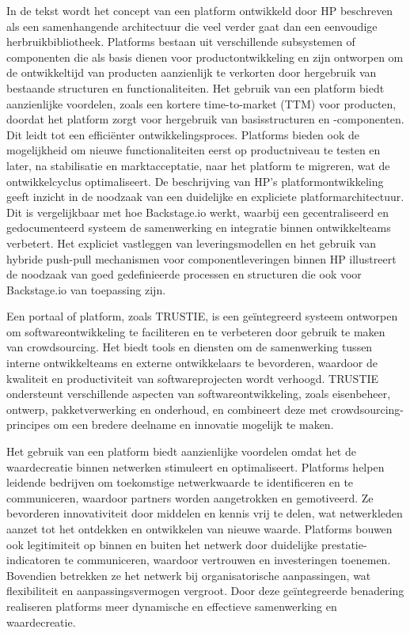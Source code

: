 \textcite{manysoftwarefirmwareproductstoday1996} In de tekst wordt het concept van een platform ontwikkeld door HP beschreven als een samenhangende architectuur die veel verder gaat dan een eenvoudige herbruikbibliotheek. Platforms bestaan uit verschillende subsystemen of componenten die als basis dienen voor productontwikkeling en zijn ontworpen om de ontwikkeltijd van producten aanzienlijk te verkorten door hergebruik van bestaande structuren en functionaliteiten. Het gebruik van een platform biedt aanzienlijke voordelen, zoals een kortere time-to-market (TTM) voor producten, doordat het platform zorgt voor hergebruik van basisstructuren en -componenten. Dit leidt tot een efficiënter ontwikkelingsproces. Platforms bieden ook de mogelijkheid om nieuwe functionaliteiten eerst op productniveau te testen en later, na stabilisatie en marktacceptatie, naar het platform te migreren, wat de ontwikkelcyclus optimaliseert. De beschrijving van HP’s platformontwikkeling geeft inzicht in de noodzaak van een duidelijke en expliciete platformarchitectuur. Dit is vergelijkbaar met hoe Backstage.io werkt, waarbij een gecentraliseerd en gedocumenteerd systeem de samenwerking en integratie binnen ontwikkelteams verbetert. Het expliciet vastleggen van leveringsmodellen en het gebruik van hybride push-pull mechanismen voor componentleveringen binnen HP illustreert de noodzaak van goed gedefinieerde processen en structuren die ook voor Backstage.io van toepassing zijn.

\textcite{Wang_2015} Een portaal of platform, zoals TRUSTIE, is een geïntegreerd systeem ontworpen om softwareontwikkeling te faciliteren en te verbeteren door gebruik te maken van crowdsourcing. Het biedt tools en diensten om de samenwerking tussen interne ontwikkelteams en externe ontwikkelaars te bevorderen, waardoor de kwaliteit en productiviteit van softwareprojecten wordt verhoogd. TRUSTIE ondersteunt verschillende aspecten van softwareontwikkeling, zoals eisenbeheer, ontwerp, pakketverwerking en onderhoud, en combineert deze met crowdsourcing-principes om een bredere deelname en innovatie mogelijk te maken.

\textcite{Perks_2017} Het gebruik van een platform biedt aanzienlijke voordelen omdat het de waardecreatie binnen netwerken stimuleert en optimaliseert. Platforms helpen leidende bedrijven om toekomstige netwerkwaarde te identificeren en te communiceren, waardoor partners worden aangetrokken en gemotiveerd. Ze bevorderen innovativiteit door middelen en kennis vrij te delen, wat netwerkleden aanzet tot het ontdekken en ontwikkelen van nieuwe waarde. Platforms bouwen ook legitimiteit op binnen en buiten het netwerk door duidelijke prestatie-indicatoren te communiceren, waardoor vertrouwen en investeringen toenemen. Bovendien betrekken ze het netwerk bij organisatorische aanpassingen, wat flexibiliteit en aanpassingsvermogen vergroot. Door deze geïntegreerde benadering realiseren platforms meer dynamische en effectieve samenwerking en waardecreatie.

